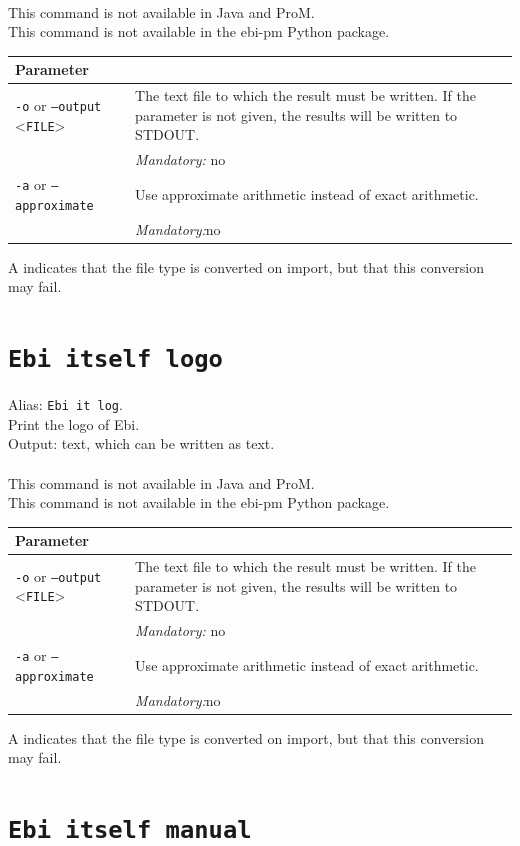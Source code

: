 {\\This command is not available in Java and ProM.
\\This command is not available in the ebi-pm Python package.
\begin{tabularx}{\linewidth}{lX}
\toprule
Parameter \\\midrule
\texttt{-o} or \texttt{--output} <\texttt{FILE}> &
The text file to which the result must be written. If the parameter is not given, the results will be written to STDOUT.\\
&\textit{Mandatory:} \quad no\\
\texttt{-a} or \texttt{--approximate} & Use approximate arithmetic instead of exact arithmetic.\\
&\textit{Mandatory:}\quad no\\
\bottomrule
\end{tabularx}
A \textdagger{} indicates that the file type is converted on import, but that this conversion may fail.
\clearpage\section{\texttt{Ebi itself logo}}
\label{command:Ebi itself logo}
Alias: \texttt{Ebi it log}.\\
Print the logo of Ebi.\\
\noindent Output: text, which can be written as  text.\\
\\This command is not available in Java and ProM.
\\This command is not available in the ebi-pm Python package.
\begin{tabularx}{\linewidth}{lX}
\toprule
Parameter \\\midrule
\texttt{-o} or \texttt{--output} <\texttt{FILE}> &
The text file to which the result must be written. If the parameter is not given, the results will be written to STDOUT.\\
&\textit{Mandatory:} \quad no\\
\texttt{-a} or \texttt{--approximate} & Use approximate arithmetic instead of exact arithmetic.\\
&\textit{Mandatory:}\quad no\\
\bottomrule
\end{tabularx}
A \textdagger{} indicates that the file type is converted on import, but that this conversion may fail.
\clearpage\section{\texttt{Ebi itself manual}}
}
